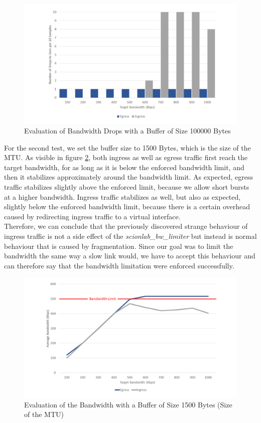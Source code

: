\begin{figure}[h]
	\centering
	\includegraphics[width=\textwidth]{img/Evaluation-Zeros-Big-Buffer.png}
	\caption{Evaluation of Bandwidth Drops with a Buffer of Size 100000 Bytes}
	\label{Evaluation of Bandwidth Drops with a Buffer of Size 100000 Bytes}
\end{figure}
\newpage

For the second test, we set the buffer size to 1500 Bytes, which is the size of the \acs{MTU}. As visible in figure \ref{Evaluation of the Bandwidth with a Buffer of Size 1500 Bytes (Size of the MTU)}, both ingress as well as egress traffic first reach the target bandwidth, for as long as it is below the enforced bandwidth limit, and then it stabilizes approximately around the bandwidth limit. As expected, egress traffic stabilizes slightly above the enforced limit, because we allow short bursts at a higher bandwidth. Ingress traffic stabilizes as well, but also as expected, slightly below the enforced bandwidth limit, because there is a certain overhead caused by redirecting ingress traffic to a virtual interface.
\\
Therefore, we can conclude that the previously discovered strange behaviour of ingress traffic is not a side effect of the \textit{scionlab\_bw\_limiter} but instead is normal behaviour that is caused by fragmentation. Since our goal was to limit the bandwidth the same way a slow link would, we have to accept this behaviour and can therefore say that the bandwidth limitation were enforced successfully.

\begin{figure}[h]
	\centering
	\includegraphics[width=\textwidth]{img/Evaluation-Bandwidth-Small-Buffer.png}
	\caption{Evaluation of the Bandwidth with a Buffer of Size 1500 Bytes (Size of the MTU)}
	\label{Evaluation of the Bandwidth with a Buffer of Size 1500 Bytes (Size of the MTU)}
\end{figure}